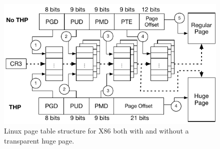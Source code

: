 \begin{figure}[t]
\centering
\includegraphics[width=\textwidth]{thermostat/figures/linux_pgtable.pdf}
\caption{
Linux page table structure for X86 both with and without a transparent huge page.
}
\label{fig:linuxpgtable}
\end{figure}
